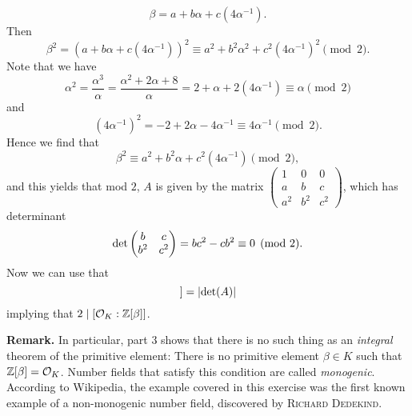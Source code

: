 \documentclass[a4paper,11pt]{article}
\begin{document}
\begin{enumerate}[labelindent=0pt, wide]
        \begin{equation*}
            \beta = a + b \alpha + c (4\alpha^{-1}).
        \end{equation*}
        Then $$\beta^2 = (a + b \alpha + c (4\alpha^{-1}))^2
        \equiv a^2 + b^2 \alpha^2 + c^2 (4\alpha^{-1})^2 \pmod 2.$$
        Note that we have 
        \begin{equation*}
            \alpha^2 = \frac {\alpha^3}\alpha = \frac{\alpha^2 + 2\alpha + 8}
            \alpha = 2 + \alpha + 2 (4 \alpha^{-1}) \equiv \alpha \pmod 2
        \end{equation*}
        and 
        \begin{equation*}
            (4 \alpha^{-1})^2 = -2 + 2\alpha - 4 \alpha^{-1} \equiv 4\alpha^{-1}
            \pmod 2.
        \end{equation*}
        Hence we find that 
        \begin{equation*}
            \beta^2 \equiv a^2 + b^2 \alpha + c^2 (4 \alpha^{-1}) \pmod 2,
        \end{equation*}
        and this yields that mod $2$, $A$ is given by the matrix
        $\left( \begin{smallmatrix}
        1 & 0 & 0 \\
        a & b & c \\
        a^2 & b^2 & c^2 
        \end{smallmatrix}\right)  $, which has determinant
        \begin{equation*}
            \det \begin{pmatrix} b & c\\ b^2 & c^2 \end{pmatrix} = bc^2 - cb^2 \equiv 0 \pmod 2.
        \end{equation*}
        Now we can use that 
        \begin{equation*}
            [\cO_K: \Z[\beta]] = \abs{\det(A)}
        \end{equation*}
        implying that $2 \mid [\mathcal{O}_K: \mathbb{Z}[\beta]]$.


\end{enumerate}

\textbf{Remark.} In particular, part 3 shows that there is no such thing as an
\emph{integral} theorem of the primitive element: There is no primitive element
$\beta \in K$ such that $\mathbb{Z}[\beta] = \mathcal{O}_K$. Number fields that satisfy this
condition are called \emph{monogenic}. According to Wikipedia, the example covered
in this exercise was the first known example of a non-monogenic number field,
discovered by \textsc{Richard Dedekind}.


\contactend
\end{document}
